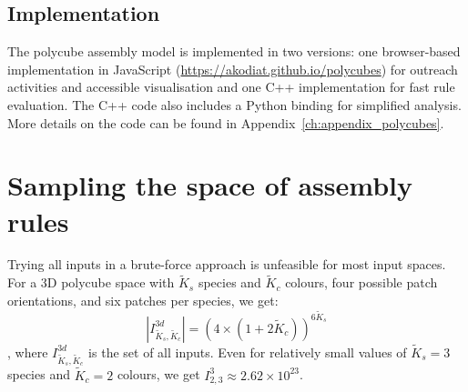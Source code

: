 \subsection{Implementation}

The polycube assembly model is implemented in two versions: one browser-based implementation in JavaScript (\url{https://akodiat.github.io/polycubes}) for outreach activities and accessible visualisation and one C++ implementation for fast rule evaluation. The C++ code also includes a Python binding for simplified analysis. More details on the code can be found in Appendix~\ref{ch:appendix_polycubes}.




\section{Sampling the space of assembly rules}
Trying all inputs in a brute-force approach is unfeasible for most input spaces. For a 3D polycube space with \(\widetilde{K}_s\) species and \(\widetilde{K}_c\) colours, four possible patch orientations, and six patches per species, we get: 
\[
\left\lvert I_{\widetilde{K}_s, \widetilde{K}_c}^{3d}\right\rvert = (4 \times (1+2\widetilde{K}_c))^{6\widetilde{K}_s}
\], where \(I_{\widetilde{K}_s, \widetilde{K}_c}^{3d}\) is the set of all inputs. Even for relatively small values of \(\widetilde{K}_s=3\) species and \(\widetilde{K}_c=2\) colours, we get \(I_{2, 3}^3 \approx 2.62 \times 10^{23}\).

